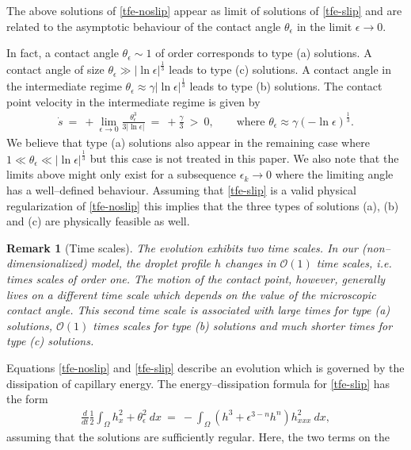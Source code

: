 \documentclass[pagesize,pdftex]{amsart}
\newtheorem{remark}[theorem]{Remark}
\newcommand{\OO}{{\mathcal O}}
\newcommand{\gam}{\gamma}
\newcommand{\eps}{\epsilon}
\newcommand{\ang}{\theta}
\newcommand{\Ome}{\Omega}
\begin{document}
The above solutions of \eqref{tfe-noslip} appear as limit of solutions of
\eqref{tfe-slip} and are related to the asymptotic behaviour of the contact
angle $\ang_\eps$ in the limit $\eps \to 0$.

\medskip

In fact, a contact angle $\ang_\eps \sim 1$ of order corresponds to type (a)
solutions. A contact angle of size $\ang _{\eps } \gg |\ln \eps|^{\frac 13}$
leads to type (c) solutions. A contact angle in the intermediate regime
$\ang _{\eps } \approx \gam |\ln \eps|^{\frac 13}$ leads to type (b)
solutions. The contact point velocity in the intermediate regime is given by
\begin{align} \label{dots-formula} %
  \dot s \ %
  = \   + \lim_{\eps \to 0} \frac {\ang_\eps^3}{3|\ln \eps|} \ %
  = \ + \frac \gam 3 \ > \ 0, \qquad %
  \text{where $\ang_\eps \approx \gam (-\ln \eps)^{\frac 13}$.}
\end{align} 
We believe that type (a) solutions also appear in the remaining case where
$1 \ll \ang_\eps \ll |\ln \eps|^{\frac 13}$ but this case is not treated in this
paper. We also note that the limits above might only exist for a subsequence
$\eps_k \to 0$ where the limiting angle has a well--defined behaviour. Assuming
that \eqref{tfe-slip} is a valid physical regularization of \eqref{tfe-noslip}
this implies that the three types of solutions (a), (b) and (c) are physically
feasible as well.
\begin{remark}[Time scales] \label{rem-time}\text{} %
  The evolution exhibits two time scales. In our (non--dimensionalized) model,
  the droplet profile $h$ changes in $\OO(1)$ time scales, i.e. times scales of
  order one. The motion of the contact point, however, generally lives on a
  different time scale which depends on the value of the microscopic contact
  angle.  This second time scale is associated with large times for type (a)
  solutions, $\OO(1)$ times scales for type (b) solutions and much shorter times
  for type (c) solutions.
\end{remark}
Equations \eqref{tfe-noslip} and \eqref{tfe-slip} describe an evolution which is
governed by the dissipation of capillary energy. The energy--dissipation formula
for \eqref{tfe-slip} has the form%
\begin{align} \label{diss-intro} %
  \frac d{dt} \frac{1}{2}\int_{\Ome }h_x^{2}  %
   +  \ang_{\eps }^{2} \ dx  \ %
  = \ -\int_{\Ome }(h^3+ \eps^{3-n} h^{n})h_{xxx}^{2}\ dx,
\end{align}%
assuming that the solutions are sufficiently regular. Here, the two terms on the
\end{document}

